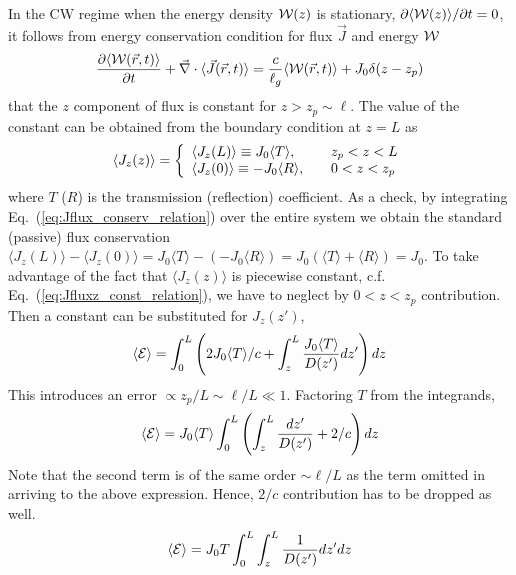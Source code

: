 In the CW regime when the energy density ${\cal W}(z)$ is stationary, $\partial \langle {\cal W}(z)\rangle/\partial t=0$, it follows from energy conservation condition for flux $\vec{J}$ and energy ${\cal W}$
\begin{equation}
\frac{\partial \langle {\cal W}(\vec{r},t)\rangle }{\partial t}+\vec{\nabla} \cdot \langle\vec{J}(\vec{r},t)\rangle=
\frac{c}{\ell_g}\langle {\cal W}(\vec{r},t)\rangle+J_0 \delta(z-z_p)
\label{eq:Jflux_conserv_relation}
\end{equation}
 that the $z$ component of flux is constant for $z>z_p\sim\ell$. The value of the constant can be obtained from the boundary condition at $z=L$ as
\begin{equation}
\langle J_z(z)\rangle=\left\{
\begin{array}{l l}
\langle J_z(L)\rangle\equiv J_0 \langle T \rangle ,&\quad z_p<z<L\\
\langle J_z(0)\rangle\equiv -J_0 \langle R \rangle,&\quad 0<z<z_p\\
\end{array} \right.
\label{eq:Jfluxz_const_relation}
\end{equation}
where $T$ ($R$) is the transmission (reflection) coefficient. As a check, by integrating Eq.~(\ref{eq:Jflux_conserv_relation}) over the entire system we obtain the standard (passive) flux conservation $\langle J_z(L)\rangle -\langle J_z(0)\rangle =J_0 \langle T \rangle-(-J_0 \langle R \rangle)=J_0(\langle T \rangle+\langle R \rangle)=J_0$. To take advantage of the fact that $\langle J_z(z)\rangle$ is piecewise constant, c.f. Eq.~(\ref{eq:Jfluxz_const_relation}), we have to neglect by $0<z<z_p$ contribution. Then a constant can be substituted for $J_z(z')$,
\begin{equation}
\langle {\cal E} \rangle = \int_0^L \left( 2J_0\langle T \rangle/c + \int_z^L\frac{J_0 \langle T \rangle }{D(z^\prime)}dz^\prime\right) dz
\end{equation}
This introduces an error $\propto z_p/L\sim\ell/L\ll 1$. Factoring $T$ from the integrands,
\begin{equation}
\langle {\cal E} \rangle =J_0\langle T \rangle\int_0^L \left( \int_z^L\frac{dz^\prime}{D(z^\prime)}+2/c\right) dz
\label{eq:E1a_relation}
\end{equation}
Note that the second term is of the same order $\sim \ell/L$ as the term omitted in arriving to the above expression. Hence, $2/c$ contribution has to be dropped as well.
\begin{equation}
\langle {\cal E} \rangle =J_0T\int_0^L \int_z^L \frac{1}{D(z^\prime)}dz^\prime dz
\end{equation}

